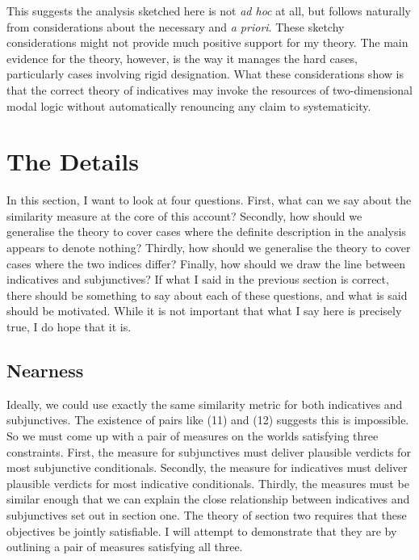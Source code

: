 \documentclass[
  11pt,
  letterpaper,
  DIV=11,
  numbers=noendperiod,
  twoside]{scrartcl}
\begin{document}
This suggests the analysis sketched here is not \emph{ad hoc} at all,
but follows naturally from considerations about the necessary and
\emph{a priori}. These sketchy considerations might not provide much
positive support for my theory. The main evidence for the theory,
however, is the way it manages the hard cases, particularly cases
involving rigid designation. What these considerations show is that the
correct theory of indicatives may invoke the resources of
two-dimensional modal logic without automatically renouncing any claim
to systematicity.

\section{The Details}\label{the-details}

In this section, I want to look at four questions. First, what can we
say about the similarity measure at the core of this account? Secondly,
how should we generalise the theory to cover cases where the definite
description in the analysis appears to denote nothing? Thirdly, how
should we generalise the theory to cover cases where the two indices
differ? Finally, how should we draw the line between indicatives and
subjunctives? If what I said in the previous section is correct, there
should be something to say about each of these questions, and what is
said should be motivated. While it is not important that what I say here
is precisely true, I do hope that it is.

\subsection{Nearness}\label{nearness}

Ideally, we could use exactly the same similarity metric for both
indicatives and subjunctives. The existence of pairs like (11) and (12)
suggests this is impossible. So we must come up with a pair of measures
on the worlds satisfying three constraints. First, the measure for
subjunctives must deliver plausible verdicts for most subjunctive
conditionals. Secondly, the measure for indicatives must deliver
plausible verdicts for most indicative conditionals. Thirdly, the
measures must be similar enough that we can explain the close
relationship between indicatives and subjunctives set out in section
one. The theory of section two requires that these objectives be jointly
satisfiable. I will attempt to demonstrate that they are by outlining a
pair of measures satisfying all three.
\end{document}
